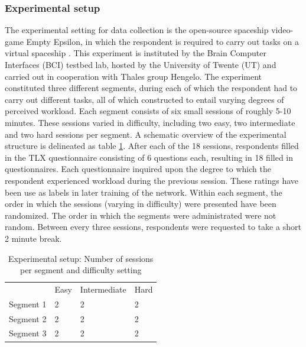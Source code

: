 \documentclass[12pt]{article}
\begin{document}
\subsubsection{Experimental setup}
The experimental setting for data collection is the open-source spaceship video-game Empty Epsilon, in which the respondent is required to carry out tasks on a virtual spaceship \cite{daid2016empty}. This experiment is instituted by the Brain Computer Interfaces (BCI) testbed lab, hosted by the University of Twente (UT) and carried out in cooperation with Thales group Hengelo. The experiment constituted three different segments, during each of which the respondent had to carry out different tasks, all of which constructed to entail varying degrees of perceived workload. Each segment consists of six small sessions of roughly 5-10 minutes. These sessions varied in difficulty, including two easy, two intermediate and two hard sessions per segment. A schematic overview of the experimental structure is delineated as table \ref{table:expsetup}. After each of the 18 sessions, respondents filled in the TLX questionnaire consisting of 6 questions each, resulting in 18 filled in questionnaires. Each questionnaire inquired upon the degree to which the respondent experienced workload during the previous session. These ratings have been use as labels in later training of the network. Within each segment, the order in which the sessions (varying in difficulty) were presented have been randomized. The order in which the segments were administrated were not random. Between every three sessions, respondents were requested to take a short 2 minute break.
\bigskip
\bgroup
\def\arraystretch{1.6}%
\begin{table}[h]
\centering
\caption{Experimental setup: Number of sessions per segment and difficulty setting}
\label{table:expsetup}
\begin{tabular}{llll}
                               & Easy                   & Intermediate           & Hard                   \\ \cline{2-4} 
\multicolumn{1}{l|}{Segment 1} & \multicolumn{1}{l|}{2} & \multicolumn{1}{l|}{2} & \multicolumn{1}{l|}{2} \\ \cline{2-4} 
\multicolumn{1}{l|}{Segment 2} & \multicolumn{1}{l|}{2} & \multicolumn{1}{l|}{2} & \multicolumn{1}{l|}{2} \\ \cline{2-4} 
\multicolumn{1}{l|}{Segment 3} & \multicolumn{1}{l|}{2} & \multicolumn{1}{l|}{2} & \multicolumn{1}{l|}{2} \\ \cline{2-4} 
\end{tabular}
\end{table}
\egroup
\bigskip 
\end{document}
